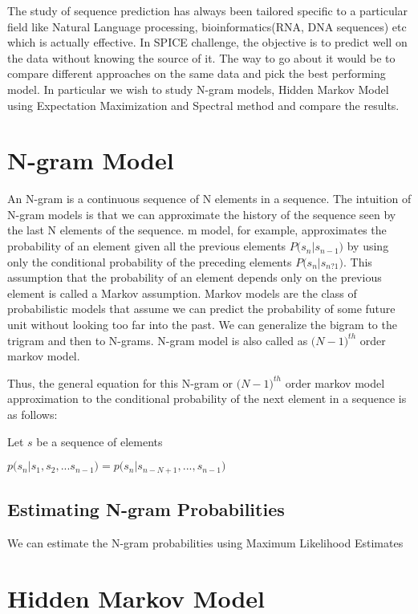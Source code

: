 \documentclass{article} %
\begin{document}
The study of sequence prediction has always been tailored specific to a particular field like Natural Language processing, bioinformatics(RNA, DNA sequences) etc which is actually effective. In SPICE challenge, the objective is to predict well on the data without knowing the source of it. The way to go about it would be to compare different approaches on the same data and pick the best performing model. In particular we wish to study N-gram models, Hidden Markov Model using Expectation Maximization and Spectral method and compare the results.

\section{N-gram Model}
\label{N-Gram Model}
An N-gram is a continuous sequence of N elements in a sequence. The intuition of N-gram models is that we can approximate the history of the sequence seen by the last N elements of the sequence. m model, for example, approximates the probability of an element given all the previous elements $P\big(s_n|s_{n-1}\big)$ by using only the conditional probability of the preceding elements $P\big(s_n|s_{n?1}\big)$. This assumption that the probability of an element depends only on the previous element is called a Markov assumption. Markov models are the class of probabilistic models that assume we can predict the probability of some future unit without looking too far into the past. We can generalize the bigram to the trigram and then to N-grams. N-gram model is also called as $\big(N-1\big)^{th}$ order markov model.

Thus, the general equation for this N-gram or $\big(N-1\big)^{th}$ order markov model approximation to the conditional probability of the next element in a sequence is as follows:

Let $s$ be a sequence of elements

$p\big(s_n|s_1, s_2, . . . s_{n-1}\big) = p\big(s_n|s_{n-N+1}, . . . , s_{n-1}\big)$

\subsection{Estimating N-gram Probabilities}
We can estimate the N-gram probabilities using Maximum Likelihood Estimates 


\section{Hidden Markov Model}
\label{HMM}
\end{document}
